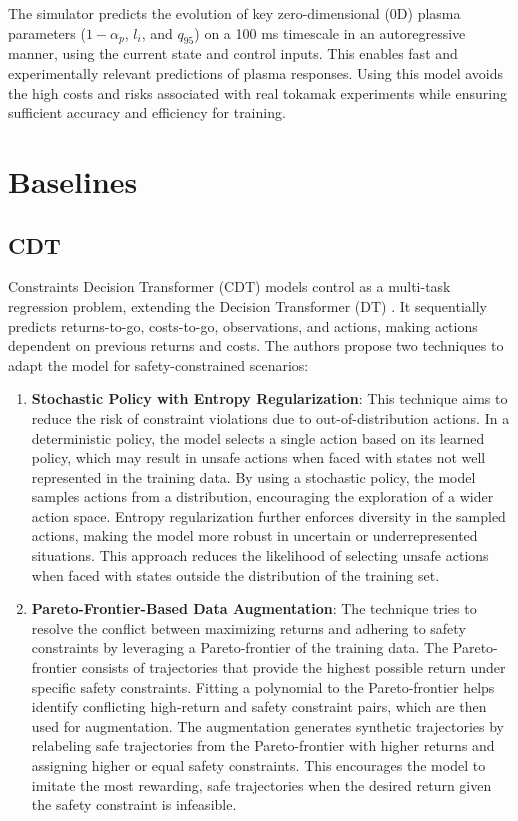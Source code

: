 The simulator predicts the evolution of key zero-dimensional (0D) plasma parameters ($1-\alpha_p$, $l_i$, and $q_{95}$) on a 100 ms timescale in an autoregressive manner, using the current state and control inputs. This enables fast and experimentally relevant predictions of plasma responses. Using this model avoids the high costs and risks associated with real tokamak experiments while ensuring sufficient accuracy and efficiency for training.





\section{Baselines}

\subsection{CDT}
Constraints Decision Transformer (CDT) \citep{liu2023constrained} models control as a multi-task regression problem, extending the Decision Transformer (DT) \citep{chen2021decision}. It sequentially predicts returns-to-go, costs-to-go, observations, and actions, making actions dependent on previous returns and costs. The authors propose two techniques to adapt the model for safety-constrained scenarios:

\begin{enumerate}
\item \textbf{Stochastic Policy with Entropy Regularization}: This technique aims to reduce the risk of constraint violations due to out-of-distribution actions. In a deterministic policy, the model selects a single action based on its learned policy, which may result in unsafe actions when faced with states not well represented in the training data. By using a stochastic policy, the model samples actions from a distribution, encouraging the exploration of a wider action space. Entropy regularization further enforces diversity in the sampled actions, making the model more robust in uncertain or underrepresented situations. This approach reduces the likelihood of selecting unsafe actions when faced with states outside the distribution of the training set.

\item \textbf{Pareto-Frontier-Based Data Augmentation}: The technique tries to resolve the conflict between maximizing returns and adhering to safety constraints by leveraging a Pareto-frontier of the training data. The Pareto-frontier consists of trajectories that provide the highest possible return under specific safety constraints. Fitting a polynomial to the Pareto-frontier helps identify conflicting high-return and safety constraint pairs, which are then used for augmentation. The augmentation generates synthetic trajectories by relabeling safe trajectories from the Pareto-frontier with higher returns and assigning higher or equal safety constraints. This encourages the model to imitate the most rewarding, safe trajectories when the desired return given the safety constraint is infeasible.

\end{enumerate}

